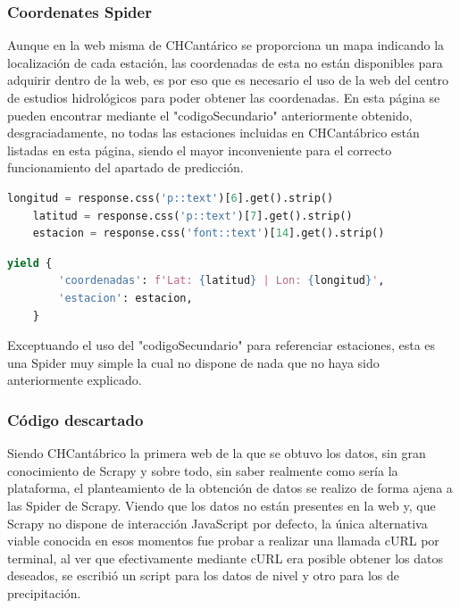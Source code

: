 \subsubsection{Coordenates Spider}
Aunque en la web misma de CHCantárico se proporciona un mapa indicando la localización de cada estación, las coordenadas de esta no están disponibles para adquirir dentro de la web, es por eso que es necesario el uso de la web del centro de estudios hidrológicos para poder obtener las coordenadas.\newline
\newline
En esta página se pueden encontrar mediante el "codigoSecundario" anteriormente obtenido, desgraciadamente, no todas las estaciones incluidas en CHCantábrico están listadas en esta página, siendo el mayor inconveniente para el correcto funcionamiento del apartado de predicción.

\begin{lstlisting}[language=Python, caption={Selector en \textit{parse()} de CHCantábrico Coordinates Spider}]
	longitud = response.css('p::text')[6].get().strip()
	latitud = response.css('p::text')[7].get().strip()
	estacion = response.css('font::text')[14].get().strip()
\end{lstlisting}

\begin{lstlisting}[language=Python, caption={Guardado de datos de CHCantábrico Coordinates Spider}]
	yield {
		'coordenadas': f'Lat: {latitud} | Lon: {longitud}',
		'estacion': estacion,
	}
\end{lstlisting}

Exceptuando el uso del "codigoSecundario" para referenciar estaciones, esta es una Spider muy simple la cual no dispone de nada que no haya sido anteriormente explicado.

\subsubsection{Código descartado}
Siendo CHCantábrico la primera web de la que se obtuvo los datos, sin gran conocimiento de Scrapy y sobre todo, sin saber realmente como sería la plataforma, el planteamiento de la obtención de datos se realizo de forma ajena a las Spider de Scrapy.\newline
\newline
Viendo que los datos no están presentes en la web y, que Scrapy no dispone de interacción JavaScript por defecto, la única alternativa viable conocida en esos momentos fue probar a realizar una llamada cURL por terminal, al ver que efectivamente mediante cURL era posible obtener los datos deseados, se escribió un script para los datos de nivel y otro para los de precipitación.

